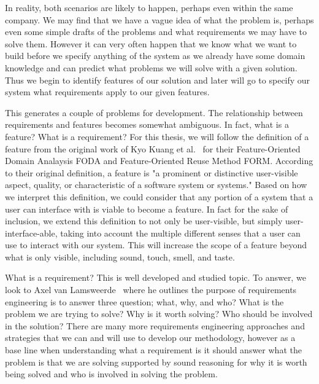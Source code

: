 In reality, both scenarios are likely to happen, perhaps even within the same company. We may find that we have a vague idea of what the problem is, perhaps even some simple drafts of the problems and what requirements we may have to solve them. However it can very often happen that we know what we want to build before we specify anything of the system as we already have some domain knowledge and can predict what problems we will solve with a given solution. Thus we begin to identify features of our solution and later will go to specify our system what requirements apply to our given features.

This generates a couple of problems for development. The relationship between requirements and features becomes somewhat ambiguous. In fact, what is a feature? What is a requirement? For this thesis, we will follow the definition of a feature from the original work of Kyo Kuang et al.~\cite{kang1990feature, kang1998form} for their Feature-Oriented Domain Analaysis \ac{FODA} and Feature-Oriented Reuse Method \ac{FORM}. According to their original definition, a feature is "a prominent or distinctive user-visible aspect, quality, or characteristic of a software system or systems." Based on how we interpret this definition, we could consider that any portion of a system that a user can interface with is viable to become a feature. In fact for the sake of inclusion, we extend this definition to not only be user-visible, but simply user-interface-able, taking into account the multiple different senses that a user can use to interact with our system. This will increase the scope of a feature beyond what is only visible, including sound, touch, smell, and taste. 

What is a requirement? This is well developed and studied topic. To answer, we look to Axel van Lamsweerde~\cite{lamsweerde2009requirements} where he outlines the purpose of requirements engineering is to answer three question; what, why, and who? What is the problem we are trying to solve? Why is it worth solving? Who should be involved in the solution? There are many more requirements engineering approaches and strategies that we can and will use to develop our methodology, however as a base line when understanding what a requirement is it should answer what the problem is that we are solving supported by sound reasoning for why it is worth being solved and who is involved in solving the problem. 

